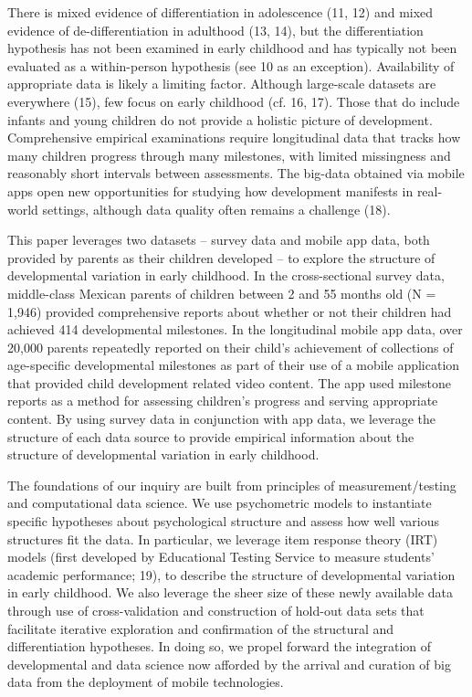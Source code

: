 \documentclass[man]{apa7}
\begin{document}
There is mixed evidence of differentiation in adolescence (11, 12)
and mixed evidence of de-differentiation in adulthood (13, 14), but the
differentiation hypothesis has not been examined in early childhood and
has typically not been evaluated as a within-person hypothesis (see 10
as an exception). Availability of appropriate data is likely a limiting
factor. Although large-scale datasets are everywhere (15), few
focus on early childhood (cf. 16, 17).  Those that do include infants and young children do not provide a
holistic picture of development. Comprehensive empirical
examinations require longitudinal data that tracks how many children
progress through many milestones, with limited missingness and
reasonably short intervals between assessments. The big-data obtained
via mobile apps open new opportunities for studying how development
manifests in real-world settings, although data quality often remains a
challenge (18).

This paper leverages two datasets -- survey data and mobile app data, both provided by parents as their children developed -- to explore
the structure of developmental variation in early childhood. In the
cross-sectional survey data, middle-class Mexican parents of children
between 2 and 55 months old (N = 1,946) provided comprehensive reports
about whether or not their children had achieved 414 developmental
milestones. In the longitudinal mobile app data, over 20,000 parents
repeatedly reported on their child's achievement of collections of
age-specific developmental milestones as part of their use of a mobile
application that provided child development related video content. The
app used milestone reports as a method for assessing children's progress
and serving appropriate content. By using survey data in conjunction
with app data, we leverage the structure of each data source to provide
empirical information about the structure of developmental variation
in early childhood.

The foundations of our inquiry are built from  principles of
measurement/testing and computational data science. We use psychometric
models to instantiate specific hypotheses about psychological structure
and assess how well various structures ﬁt the data. In particular, we
leverage item response theory (IRT) models (first developed by
Educational Testing Service to measure students' academic performance;
19), to describe the structure of developmental variation in early
childhood. We also leverage the sheer size of these newly available data
through use of cross-validation and construction of hold-out data sets
that facilitate iterative exploration and confirmation of the structural
and differentiation hypotheses. In doing so, we propel forward the
integration of developmental and data science now afforded by the
arrival and curation of big data from the deployment of mobile technologies.
\end{document}

